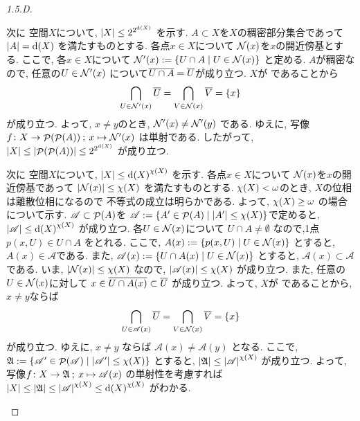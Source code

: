 \documentclass[uplatex, dvipdfmx, a4paper, 12pt, class=jsarticle, crop=false]{standalone}
\begin{document}
\begin{proof}[1.5.D]
\begin{enumerate}
		次に \Hausdorff 空間\( X \)について,
		\( \cardinality{X} \leq
		2^{2^{\topdensity{X}}}\)
		を示す.
		\( A \subset X \)を\( X \)の稠密部分集合であって
		\( \cardinality{A} = \topdensity{X} \)
		を満たすものとする.
		各点\( x \in X \)について
		\( \mathcal{N}\lrparen{x} \)を\( x \)の開近傍基とする.
		ここで, 各\( x \in X \)について
		\( \mathcal{N}'\lrparen{x}
		\defeq \setcomp{U \cap A}{U \in \mathcal{N}\lrparen{x}} \)
		と定める.
		\( A \)が稠密なので, 任意の\( U \in \mathcal{N}'\lrparen{x} \)
		について\( \overline{U \cap A} = \overline{U} \)が成り立つ.
		\( X \)が  であることから
		\[ \bigcap_{U \in \mathcal{N}'\lrparen{x}} \topbar{U}
		= \bigcap_{V \in \mathcal{N}\lrparen{x}} \topbar{V}
		= \lrbrace{x} \]
		が成り立つ.
		よって, \( x \neq y \)のとき,
		\( \mathcal{N}'\lrparen{x} \neq \mathcal{N}'\lrparen{y} \)
		である.
		ゆえに, 写像\( \morphto{f}{X}{\pow(\pow(A))}
		{x}{\mathcal{N}'\lrparen{x}} \)
		は単射である.
		したがって,
		\( \cardinality{X} \leq \cardinality{\pow(\pow(A))}
		\leq 2^{2^{\topdensity{X}}} \)
		が成り立つ.

		次に \Hausdorff 空間\( X \)について,
		\( \cardinality{X} \leq
		\topdensity{X}^{\topcharacter{X}} \)
		を示す.
		各点\( x \in X \)について
		\( \mathcal{N}\lrparen{x} \)を\( x \)の開近傍基であって
		\( \cardinality{\mathcal{N}\lrparen{x}} \leq \topcharacter{X} \)
		を満たすものとする.
		\( \topcharacter{X} < \omega \)のとき,
		\( X \)の位相は離散位相になるので
		不等式の成立は明らかである.
		よって, \( \topcharacter{X} \geq \omega \)
		の場合について示す.
		\( \mathscr{A} \subset \mathop{\mathcal{P}}\nolimits(A) \)を
		\( \mathscr{A} \defeq \setcomp{A' \in \pow(A)}
		{\cardinality{A'} \leq \topcharacter{X}} \)で定めると,
		\( \cardinality{\mathscr{A}}
		\leq \topdensity{X}^{\topcharacter{X}} \)
		が成り立つ.
		各\( U \in \mathcal{N}\lrparen{x} \)について
		\( U \cap A \neq \emptyset \)
		なので,1点\( p(x, U) \in U \cap A \)
		をとれる.
		ここで, \( A(x) \defeq \setcomp{p(x, U)}
		{U \in \mathcal{N}\lrparen{x}} \)
		とすると, \( A(x) \in \mathscr{A} \)である.
		また,
		\( \mathscr{A}(x) \defeq \setcomp{U \cap A(x)}
		{U \in \mathcal{N}\lrparen{x}} \)
		とすると,
		\( \mathscr{A}(x) \subset \mathscr{A} \)
		である.
		いま, \( \cardinality{\mathcal{N}\lrparen{x}} \leq \topcharacter{X} \)
		なので,
		\( \cardinality{\mathscr{A}(x)} \leq \topcharacter{X}\)
		が成り立つ.
		また, 任意の\( U \in \mathcal{N}\lrparen{x} \)に対して
		\( x \in \overline{U \cap A(x)} \subset \overline{U} \)
		が成り立つ.
		よって, \( X \)が  であることから,
		\( x \neq y \)ならば
		\[ \bigcap_{U \in \mathscr{A}(x)} \topbar{U}
		= \bigcap_{V \in \mathcal{N}\lrparen{x}} \topbar{V}
		= \lrbrace{x} \]
		が成り立つ. ゆえに, \( x \neq y \)
		ならば
		\( \mathscr{A}(x) \neq \mathscr{A}(y) \)
		となる.
		ここで, \( \mathfrak{A} \defeq
		\setcomp{\mathscr{A}' \in \pow(\mathscr{A})}
		{\cardinality{\mathscr{A}'} \leq \topcharacter{X}} \)
		とすると,
		\( \cardinality{\mathfrak{A}}
		\leq \cardinality{\mathscr{A}}^{\topcharacter{X}} \)
		が成り立つ.
		よって,
		写像\( f\colon X\to\mathfrak{A}\mathpunct{\: ; \:} x\mapsto\mathscr{A}(x) \)
		の単射性を考慮すれば
		\( \cardinality{X} \leq \cardinality{\mathfrak{A}}
		\leq \cardinality{\mathscr{A}}^{\topcharacter{X}}
		\leq \topdensity{X}^{\topcharacter{X}} \)
		がわかる.


\end{enumerate}
\end{proof}
\end{document}
